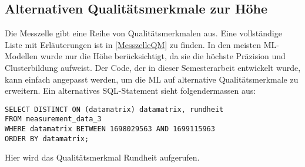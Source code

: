 \subsection{Alternativen Qualitätsmerkmale zur Höhe}
Die Messzelle gibt eine Reihe von Qualitätsmerkmalen aus. Eine vollständige Liste mit Erläuterungen ist in \ref{MesszelleQM} zu finden. In den meisten ML-Modellen wurde nur die Höhe berücksichtigt, da sie die höchste Präzision und Clusterbildung aufweist. Der Code, der in dieser Semesterarbeit entwickelt wurde, kann einfach angepasst werden, um die ML auf alternative Qualitätsmerkmale zu erweitern. Ein alternatives SQL-Statement sieht folgendermassen aus: 

\begin{verbatim}
SELECT DISTINCT ON (datamatrix) datamatrix, rundheit 
FROM measurement_data_3 
WHERE datamatrix BETWEEN 1698029563 AND 1699115963  
ORDER BY datamatrix;
\end{verbatim}

Hier wird das Qualitätsmerkmal Rundheit aufgerufen.
